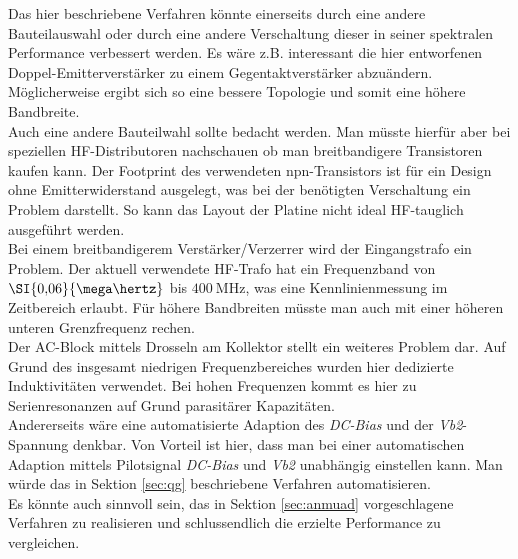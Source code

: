 Das hier beschriebene Verfahren könnte einerseits durch eine andere Bauteilauswahl oder durch eine andere Verschaltung dieser in seiner spektralen Performance verbessert werden. Es wäre z.B. interessant die hier entworfenen Doppel-Emitterverstärker zu einem Gegentaktverstärker abzuändern. Möglicherweise ergibt sich so eine bessere Topologie und somit eine höhere Bandbreite.\\
Auch eine andere Bauteilwahl sollte bedacht werden. Man müsste hierfür aber bei speziellen \ac{HF}-Distributoren nachschauen ob man breitbandigere Transistoren kaufen kann. Der Footprint des verwendeten npn-Transistors ist für ein Design ohne Emitterwiderstand ausgelegt, was bei der benötigten Verschaltung ein Problem darstellt. So kann das Layout der Platine nicht ideal \ac{HF}-tauglich ausgeführt werden.\\
Bei einem breitbandigerem Verstärker/Verzerrer wird der Eingangstrafo ein Problem. Der aktuell verwendete \ac{HF}-Trafo hat ein Frequenzband von $\SI{0{,}06}{\mega\hertz}$ bis $\SI{400}{\mega\hertz}$, was eine Kennlinienmessung im Zeitbereich erlaubt. Für höhere Bandbreiten müsste man auch mit einer höheren unteren Grenzfrequenz rechen.\\
Der \ac{AC}-Block mittels Drosseln am Kollektor stellt ein weiteres Problem dar. Auf Grund des insgesamt niedrigen Frequenzbereiches wurden hier dedizierte Induktivitäten verwendet. Bei hohen Frequenzen kommt es hier zu Serienresonanzen auf Grund parasitärer Kapazitäten.\\
Andererseits wäre eine automatisierte Adaption des \textit{DC-Bias} und der \textit{Vb2}- Spannung denkbar. Von Vorteil ist hier, dass man bei einer automatischen Adaption mittels Pilotsignal \textit{DC-Bias} und \textit{Vb2} unabhängig einstellen kann. Man würde das in Sektion \ref{sec:qg} beschriebene Verfahren automatisieren.\\
Es könnte auch sinnvoll sein, das in Sektion \ref{sec:anmuad} vorgeschlagene Verfahren zu realisieren und schlussendlich die erzielte Performance zu vergleichen.
